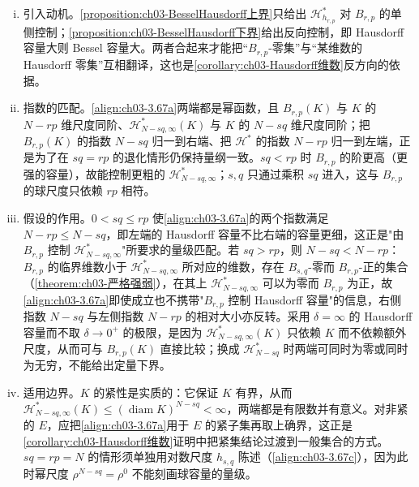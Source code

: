 \documentclass[../../main.tex]{subfiles}%
\begin{document}
\begin{remark}\label{remark:ch03-Hausdorff下界动机}
\begin{enumerate}[(i)]
\item 引入动机。\cref{proposition:ch03-BesselHausdorff上界}只给出 $\mathcal{H}^*_{h_{r,p}}$ 对 $B_{r,p}$ 的单侧控制；\cref{proposition:ch03-BesselHausdorff下界}给出反向控制，即 Hausdorff 容量大则 Bessel 容量大。两者合起来才能把“$B_{r,p}$-零集”与“某维数的 Hausdorff 零集”互相翻译，这也是\cref{corollary:ch03-Hausdorff维数}反方向的依据。
\item 指数的匹配。\eqref{align:ch03-3.67a}两端都是幂函数，且 $B_{r,p}(K)$ 与 $K$ 的 $N-rp$ 维尺度同阶、$\mathcal{H}^*_{N-sq,\infty}(K)$ 与 $K$ 的 $N-sq$ 维尺度同阶；把 $B_{r,p}(K)$ 的指数 $N-sq$ 归一到右端、把 $\mathcal{H}^*$ 的指数 $N-rp$ 归一到左端，正是为了在 $sq=rp$ 的退化情形仍保持量纲一致。$sq<rp$ 时 $B_{r,p}$ 的阶更高（更强的容量），故能控制更粗的 $\mathcal{H}^*_{N-sq,\infty}$；$s,q$ 只通过乘积 $sq$ 进入，这与 $B_{r,p}$ 的球尺度只依赖 $rp$ 相符。
\item 假设的作用。$0<sq\leqslant rp$ 使\eqref{align:ch03-3.67a}的两个指数满足 $N-rp\leqslant N-sq$，即左端的 Hausdorff 容量不比右端的容量更细，这正是"由 $B_{r,p}$ 控制 $\mathcal{H}^*_{N-sq,\infty}$"所要求的量级匹配。若 $sq>rp$，则 $N-sq<N-rp$：$B_{r,p}$ 的临界维数小于 $\mathcal{H}^*_{N-sq,\infty}$ 所对应的维数，存在 $B_{s,q}$-零而 $B_{r,p}$-正的集合（\cref{theorem:ch03-严格强弱}），在其上 $\mathcal{H}^*_{N-sq,\infty}$ 可以为零而 $B_{r,p}$ 为正，故\eqref{align:ch03-3.67a}即使成立也不携带"$B_{r,p}$ 控制 Hausdorff 容量"的信息，右侧指数 $N-sq$ 与左侧指数 $N-rp$ 的相对大小亦反转。采用 $\delta=\infty$ 的 Hausdorff 容量而不取 $\delta\to0^+$ 的极限，是因为 $\mathcal{H}^*_{N-sq,\infty}(K)$ 只依赖 $K$ 而不依赖额外尺度，从而可与 $B_{r,p}(K)$ 直接比较；换成 $\mathcal{H}^*_{N-sq}$ 时两端可同时为零或同时为无穷，不能给出定量下界。
\item 适用边界。$K$ 的紧性是实质的：它保证 $K$ 有界，从而 $\mathcal{H}^*_{N-sq,\infty}(K)\leqslant(\operatorname{diam}K)^{N-sq}<\infty$，两端都是有限数并有意义。对非紧的 $E$，应把\eqref{align:ch03-3.67a}用于 $E$ 的紧子集再取上确界，这正是\cref{corollary:ch03-Hausdorff维数}证明中把紧集结论过渡到一般集合的方式。$sq=rp=N$ 的情形须单独用对数尺度 $h_{s,q}$ 陈述（\eqref{align:ch03-3.67c}），因为此时幂尺度 $\rho^{N-sq}=\rho^{0}$ 不能刻画球容量的量级。
\end{enumerate}
\end{remark}
\end{document}
